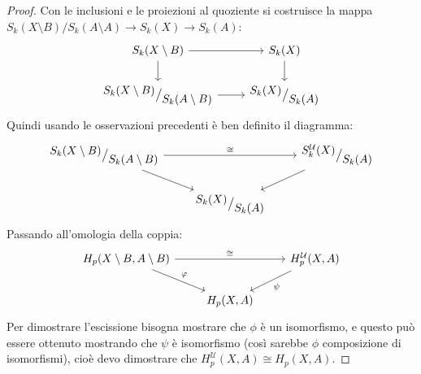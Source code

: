 \begin{proof}
  Con le inclusioni e le proiezioni al quoziente si costruisce la
  mappa $ S_k(X \setminus B) \slash S_k(A \setminus A) \to S_k(X) \to S_k(A) $:
  \[
    \begin{tikzcd}
      S_k(X \setminus B) \rar \dar & S_k(X) \dar \\
      \quot{S_k(X \setminus B)}{S_k(A \setminus B)} \rar & \quot{S_k(X)}{S_k(A)}
    \end{tikzcd}
  \]
  Quindi usando le osservazioni precedenti è ben definito il diagramma:
  \[
    \begin{tikzcd}
      \quot{S_k(X \setminus B)}{S_k(A \setminus B)} \arrow{rd}{} \arrow{rr}{\cong} & {} & \quot{S_k^\mathcal{U}(X)}{S_k(A)} \arrow{ld}{}\\
      {} & \quot{S_k(X)}{S_k(A)} & {}
    \end{tikzcd}
  \]
  Passando all'omologia della coppia:
  \[
    \begin{tikzcd}
      H_p(X \setminus B, A \setminus B) \arrow{rd}{\phi} \arrow{rr}{\cong} & {} & H_p^\mathcal{U}(X,A) \arrow{ld}{\psi} \\
      {} & H_p(X,A) & {}
    \end{tikzcd}
  \]
  Per dimostrare l'escissione bisogna mostrare che $ \phi $ è un isomorfismo, e questo può essere
  ottenuto mostrando che $ \psi $ è isomorfismo (così sarebbe $ \phi $ composizione di isomorfismi),
  cioè devo dimostrare che $ H_p^\mathcal{U}(X, A) \cong H_p(X,A) $.


\end{proof}
